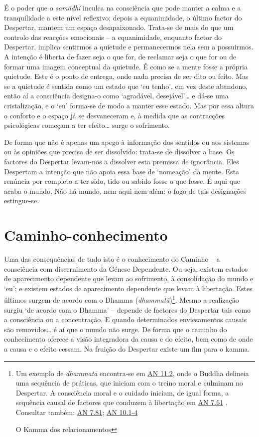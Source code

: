 É o poder que o \emph{samādhi} inculca na consciência que pode manter a calma e a tranquilidade a este nível reflexivo; depois a equanimidade, o último factor do Despertar, mantem um espaço desapaixonado. Trata-se de mais do que um controlo das reacções emocionais -- a equanimidade, enquanto factor do Despertar, implica sentirmos a quietude e permanecermos nela sem a possuirmos. A intenção é liberta de fazer seja o que for, de reclamar seja o que for ou de formar uma imagem conceptual da quietude. É como se a mente fosse a própria quietude. Este é o ponto de entrega, onde nada precisa de ser dito ou feito. Mas se a quietude é sentida como um estado que `eu tenho', em vez deste abandono, então aí a consciência designa-o como `agradável, desejável'\ldots{} e dá-se uma cristalização, e o `eu' forma-se de modo a manter esse estado. Mas por essa altura o conforto e o espaço já se desvaneceram e, à medida que as contracções psicológicas começam a ter efeito\ldots{} surge o sofrimento.

De forma que não é apenas um apego à informação dos sentidos ou aos sistemas ou às opiniões que precisa de ser dissolvido: trata-se de dissolver a base. Os factores do Despertar levam-nos a dissolver esta premissa de ignorância. Eles Despertam a intenção que não apoia essa base de `nomeação' da mente. Esta renúncia por completo a ter sido, tido ou sabido fosse o que fosse. É aqui que acaba o mundo. Não há mundo, nem aqui nem além: o fogo de tais designações estingue-se.

\section{Caminho-conhecimento}

Uma das consequências de tudo isto é o conhecimento do Caminho -- a consciência com discernimento da Génese Dependente. Ou seja, existem estados de aparecimento dependente que levam ao sofrimento, à consolidação do mundo e `eu'; e existem estados de aparecimento dependente que levam à libertação. Estes últimos surgem de acordo com o Dhamma (\emph{dhammatā})\footnote{Um exemplo de \emph{dhammatā} encontra-se em \href{https://suttacentral.net/an11.2/en/thanissaro}{AN 11.2}, onde o Buddha delineia uma sequência de práticas, que iniciam com o treino moral e culminam no Despertar. A consciência moral e o cuidado iniciam, de igual forma, a sequência causal de factores que conduzem à libertação em \href{https://suttacentral.net/an7.65/en/sujato}{AN 7.61} . Consultar também: \href{https://suttacentral.net/an7.81/en/sujato}{AN 7.81}; \href{https://suttacentral.net/an10.1/en/bodhi}{AN 10.1}\href{https://suttacentral.net/an10.2/en/bodhi}{-4}

  O Kamma dos relacionamentos}. Mesmo a realização surgiu `de acordo com o Dhamma' -- depende de factores do Despertar tais como a consciência ou a concentração. E quando determinados enviesamentos causais são removidos\ldots{} é aí que o mundo não surge. De forma que o caminho do conhecimento oferece a visão integradora da causa e do efeito, bem como de onde a causa e o efeito cessam. Na fruição do Despertar existe um fim para o kamma.

